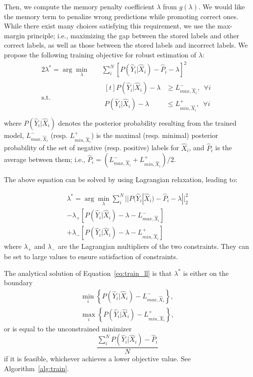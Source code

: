 \documentclass[letterpaper]{article}
\begin{document}
Then, we compute the memory penalty coefficient $\lambda$ from $g(\lambda)$. We would like the memory term to penalize wrong predictions while promoting correct ones. While there exist many  choices satisfying this requirement, we use the max-margin principle; i.e., maximizing the gap between the stored labels and other correct labels, as well as those between the stored labels and incorrect labels. We propose the following training objective for robust estimation of $\lambda$:
\begin{alignat*}{2}
 \lambda^* = \arg\min_{\lambda}  \quad & \sum_i^N [P(\hat{Y}_i|\hat{X}_i) - \hat{P}_i - \lambda]^2 \\
  \text{s.t.} \quad &  \begin{aligned}[t]
    P(\hat{Y}_i|\hat{X}_i) - \lambda & \ge L^{-}_{max, \hat{X}_i}, \,\,\,\forall i\\
    P(\hat{Y}_i|\hat{X}_i) - \lambda & \le L^{+}_{min, \hat{X}_i}, \,\,\,\forall i\\
  \end{aligned}
\end{alignat*}
where $P(\hat{Y}_i|\hat{X}_i)$ denotes the posterior probability resulting from the trained model, $L^{-}_{max, \hat{X}_i}$ (resp. $L^{+}_{min, \hat{X}_i}$) is the maximal (resp. minimal) posterior probability of the set of negative (resp. positive) labels for  $\hat{X}_i$, and $\hat{P}_i$ is the average between them; i.e., $\hat{P}_i = (L^{-}_{max, \hat{X}_i} + L^{+}_{min, \hat{X}_i})/2$.


The above equation can be solved by using Lagrangian relaxation, leading to:

\begin{multline}
\label{eq:train_ll}
\lambda^* = \arg\min_{\lambda}  \sum_i^N ||P(\hat{Y}_i|\hat{X}_i) - \hat{P}_i - \lambda||_2^2 \\
 - \lambda_+ [P(\hat{Y}_i|\hat{X}_i) - \lambda - L^{-}_{max, \hat{X}_i}] \\
 + \lambda_- [ P(\hat{Y}_i|\hat{X}_i) - \lambda  - L^{+}_{min, \hat{X}_i}]
\end{multline}
where $\lambda_+$ and $\lambda_-$ are the Lagrangian multipliers of the two constraints. They can be set to large values to ensure satisfaction of constraints. %

The analytical solution of Equation~\ref{eq:train_ll}  is that $\lambda^*$ is either on the boundary
\begin{gather*}
\min_i\left\{P(\hat{Y}_i|\hat{X}_i)-L^{-}_{max, \hat{X}_i}\right\},\\
\max_i\left\{P(\hat{Y}_i|\hat{X}_i)-L^{+}_{min, \hat{X}_i}\right\},
\end{gather*}
or is equal to the unconstrained minimizer
\[
\frac {\sum_i^N  P(\hat{Y}_i|\hat{X}_i) - \hat{P}_i}{N}
\]
if it is feasible, whichever achieves a lower objective value. See Algorithm~\ref{alg:train}.
\end{document}
